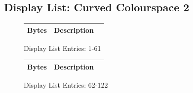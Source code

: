 \subsection*{Display List: Curved Colourspace 2}
\vspace{-0.5cm}
\begin{minipage}[b]{0.31\linewidth}
  \begin{figure}[H]
    {
      \setlength{\tabcolsep}{3.0pt}
      \setlength\cmidrulewidth{\heavyrulewidth} %
      \begin{adjustbox}{height=8.5cm}

        \begin{tabular}{lll}
          \toprule
          Bytes       & Description                                                         \\
          \midrule
          
        \end{tabular}

      \end{adjustbox}

    }\caption*{Display List Entries: 1-61}
  \end{figure}
\end{minipage}
\hspace{0.1cm}
\begin{minipage}[b]{0.31\linewidth}
  \begin{figure}[H]
    {
      \setlength{\tabcolsep}{3.0pt}
      \setlength\cmidrulewidth{\heavyrulewidth} %
      \begin{adjustbox}{height=8.5cm}

        \begin{tabular}{lll}
          \toprule
          Bytes       & Description                                                         \\
          \midrule
        \end{tabular}

      \end{adjustbox}

    }\caption*{Display List Entries: 62-122}
  \end{figure}
\end{minipage}
\hspace{0.1cm}

